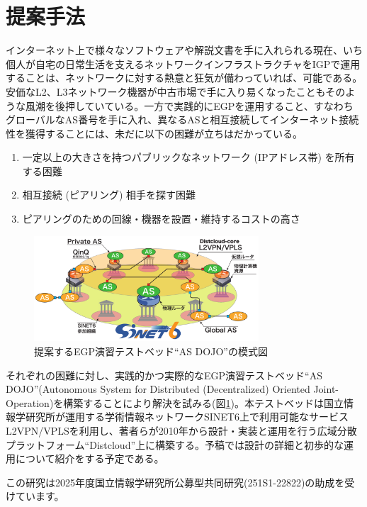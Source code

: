 \documentclass[Japanese]{dicomopapers}
\begin{document}
\section{提案手法}

インターネット上で様々なソフトウェアや解説文書を手に入れられる現在、いち個人が自宅の日常生活を支えるネットワークインフラストラクチャをIGPで運用することは、ネットワークに対する熱意と狂気が備わっていれば、可能である。安価なL2、L3ネットワーク機器が中古市場で手に入り易くなったこともそのような風潮を後押していている。一方で実践的にEGPを運用すること、すなわちグローバルなAS番号を手に入れ、異なるASと相互接続してインターネット接続性を獲得することには、未だに以下の困難が立ちはだかっている。

\begin{enumerate}
 \item 一定以上の大きさを持つパブリックなネットワーク (IPアドレス帯) を所有する困難
 \item 相互接続 (ピアリング) 相手を探す困難
 \item ピアリングのための回線・機器を設置・維持するコストの高さ
\end{enumerate}

\begin{figure}[h]
\begin{center}
\includegraphics[width=84mm,clip]{AS_dojo.pdf}
\caption{提案するEGP演習テストベッド``AS DOJO''の模式図}
\label{AS_dojo}
\end{center}
\end{figure}

それぞれの困難に対し、実践的かつ実際的なEGP演習テストベッド``AS DOJO''(Autonomous System for Distributed (Decentralized) Oriented Joint-Operation)を構築することにより解決を試みる(図\ref{AS_dojo})。本テストベッドは国立情報学研究所が運用する学術情報ネットワークSINET6上で利用可能なサービスL2VPN/VPLSを利用し、著者らが2010年から設計・実装と運用を行う広域分散プラットフォーム``Distcloud''上に構築する。予稿では設計の詳細と初歩的な運用について紹介をする予定である。

\begin{acknowledgment}
この研究は2025年度国立情報学研究所公募型共同研究(251S1-22822)の助成を受けています。
\end{acknowledgment}
\end{document}
